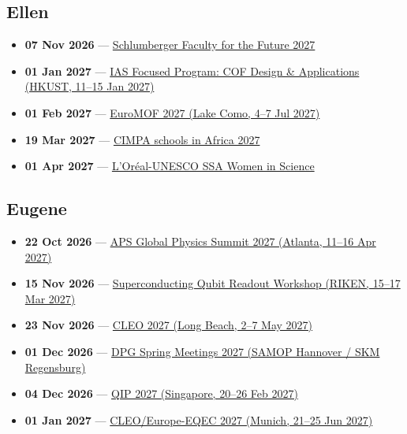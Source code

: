 \subsection*{Ellen}
\begin{itemize}[leftmargin=1.4em,itemsep=0.1em]
  \item \textbf{07 Nov 2026} --- \href{https://schlumbergerfoundation.com/apply-now/}{Schlumberger Faculty for the Future 2027}
  \item \textbf{01 Jan 2027} --- \href{https://iasprogram.hkust.edu.hk/2027cofda/home.php}{IAS Focused Program: COF Design \& Applications (HKUST, 11--15 Jan 2027)}
  \item \textbf{01 Feb 2027} --- \href{https://euromof2027.com/}{EuroMOF 2027 (Lake Como, 4--7 Jul 2027)}
  \item \textbf{19 Mar 2027} --- \href{https://www.cimpa.info/}{CIMPA schools in Africa 2027}
  \item \textbf{01 Apr 2027} --- \href{https://www.fondationloreal.com/our-programs-women-science-national-and-regional-young-talents-programs/sub-saharan-africa-young}{L'Oréal-UNESCO SSA Women in Science}
\end{itemize}

\subsection*{Eugene}
\begin{itemize}[leftmargin=1.4em,itemsep=0.1em]
  \item \textbf{22 Oct 2026} --- \href{https://summit.aps.org/attend/abstracts}{APS Global Physics Summit 2027 (Atlanta, 11--16 Apr 2027)}
  \item \textbf{15 Nov 2026} --- \href{https://rqc.riken.jp/sqrw2027/}{Superconducting Qubit Readout Workshop (RIKEN, 15--17 Mar 2027)}
  \item \textbf{23 Nov 2026} --- \href{https://cleoconference.org/}{CLEO 2027 (Long Beach, 2--7 May 2027)}
  \item \textbf{01 Dec 2026} --- \href{https://www.dpg-physik.de/aktivitaeten-und-programme/tagungen/fruehjahrstagungen/2027}{DPG Spring Meetings 2027 (SAMOP Hannover / SKM Regensburg)}
  \item \textbf{04 Dec 2026} --- \href{https://qipconference.org/2027/call/}{QIP 2027 (Singapore, 20--26 Feb 2027)}
  \item \textbf{01 Jan 2027} --- \href{https://cleoeurope.org/deadlines/}{CLEO/Europe-EQEC 2027 (Munich, 21--25 Jun 2027)}
\end{itemize}

